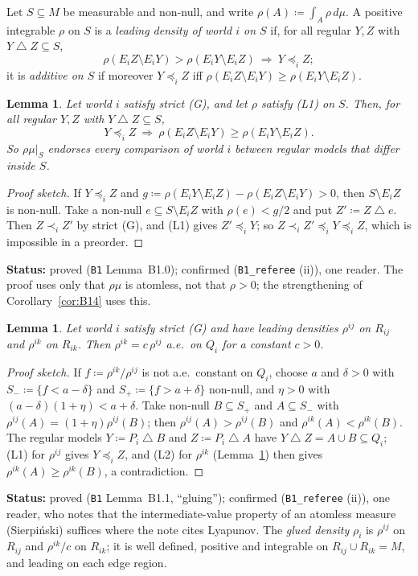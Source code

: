 \documentclass[11pt]{article}
\newtheorem{lemma}[theorem]{Lemma}
\theoremstyle{definition}
\theoremstyle{remark}
\newcommand{\sd}{\mathbin{\triangle}}
\newcommand{\src}[1]{\texttt{#1}}
\newcommand{\status}[1]{\par\smallskip\noindent\textbf{Status:} #1\par\smallskip}
\begin{document}
Let $S\subseteq M$ be measurable and non-null, and write $\rho(A)\coloneqq\int_A\rho\,d\mu$. A positive integrable $\rho$ on $S$ is a \emph{leading density of world $i$ on $S$} if, for all regular $Y,Z$ with $Y\sd Z\subseteq S$,
\[
\rho(E_iZ\setminus E_iY)>\rho(E_iY\setminus E_iZ)\ \Longrightarrow\ Y\preceq_iZ ;\tag{L1}
\]
it is \emph{additive on $S$} if moreover $Y\preceq_iZ$ iff $\rho(E_iZ\setminus E_iY)\ge\rho(E_iY\setminus E_iZ)$.

\begin{lemma}\label{lem:B10}
Let world $i$ satisfy strict (G), and let $\rho$ satisfy (L1) on $S$. Then, for all regular $Y,Z$ with $Y\sd Z\subseteq S$,
\[
Y\preceq_iZ\ \Longrightarrow\ \rho(E_iZ\setminus E_iY)\ge\rho(E_iY\setminus E_iZ).\tag{L2}
\]
So $\rho\mu|_S$ endorses every comparison of world $i$ between regular models that differ inside $S$.
\end{lemma}
\begin{proof}[Proof sketch]
If $Y\preceq_iZ$ and $g\coloneqq\rho(E_iY\setminus E_iZ)-\rho(E_iZ\setminus E_iY)>0$, then $S\setminus E_iZ$ is non-null. Take a non-null $e\subseteq S\setminus E_iZ$ with $\rho(e)<g/2$ and put $Z'\coloneqq Z\sd e$. Then $Z\prec_iZ'$ by strict (G), and (L1) gives $Z'\preceq_iY$; so $Z\prec_iZ'\preceq_iY\preceq_iZ$, which is impossible in a preorder.
\end{proof}
\status{proved (\src{B1} Lemma~B1.0); confirmed (\src{B1\_referee} (ii)), one reader. The proof uses only that $\rho\mu$ is atomless, not that $\rho>0$; the strengthening of Corollary~\ref{cor:B14} uses this.}

\begin{lemma}\label{lem:B11}
Let world $i$ satisfy strict (G) and have leading densities $\rho^{ij}$ on $R_{ij}$ and $\rho^{ik}$ on $R_{ik}$. Then $\rho^{ik}=c\,\rho^{ij}$ a.e.\ on $Q_i$ for a constant $c>0$.
\end{lemma}
\begin{proof}[Proof sketch]
If $f\coloneqq\rho^{ik}/\rho^{ij}$ is not a.e.\ constant on $Q_i$, choose $a$ and $\delta>0$ with $S_-\coloneqq\{f<a-\delta\}$ and $S_+\coloneqq\{f>a+\delta\}$ non-null, and $\eta>0$ with $(a-\delta)(1+\eta)<a+\delta$. Take non-null $B\subseteq S_+$ and $A\subseteq S_-$ with $\rho^{ij}(A)=(1+\eta)\rho^{ij}(B)$; then $\rho^{ij}(A)>\rho^{ij}(B)$ and $\rho^{ik}(A)<\rho^{ik}(B)$. The regular models $Y\coloneqq P_i\sd B$ and $Z\coloneqq P_i\sd A$ have $Y\sd Z=A\cup B\subseteq Q_i$; (L1) for $\rho^{ij}$ gives $Y\preceq_iZ$, and (L2) for $\rho^{ik}$ (Lemma~\ref{lem:B10}) then gives $\rho^{ik}(A)\ge\rho^{ik}(B)$, a contradiction.
\end{proof}
\status{proved (\src{B1} Lemma~B1.1, ``gluing''); confirmed (\src{B1\_referee} (ii)), one reader, who notes that the intermediate-value property of an atomless measure (Sierpi\'nski) suffices where the note cites Lyapunov. The \emph{glued density} $\rho_i$ is $\rho^{ij}$ on $R_{ij}$ and $\rho^{ik}/c$ on $R_{ik}$; it is well defined, positive and integrable on $R_{ij}\cup R_{ik}=M$, and leading on each edge region.}
\end{document}
